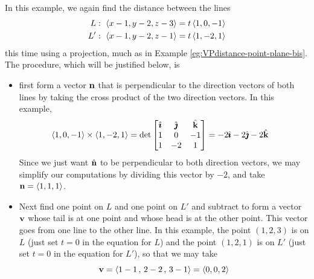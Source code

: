 \begin{eg}\label{eg:VPdistance-line-line-bis}
In this example, we again find the distance between the lines
\begin{align*}
L&:\  \left< x-1,y-2,z-3\right> = t \left< 1,0,-1 \right> \\
L'&:\ \left< x-1,y-2,z-1\right> = t \left< 1,-2,1 \right> 
\end{align*}
this time using a projection, much as in 
Example \ref{eg:VPdistance-point-plane-bis}. The procedure,
which will be justified below, is
\begin{itemize}
\item
first form a vector $\mathbf{n}$ that is perpendicular to the direction vectors
of both lines by taking the cross product of the two direction vectors.
In this example,
\begin{align*}
\left< 1,0,-1\right> \times\left< 1,-2,1\right> 
    & = \det\left[\begin{matrix}\hat{\pmb{\imath}}&\hat{\pmb{\jmath}}&\hat{\mathbf{k}}\\
                                       1 & 0 & -1\\
                                       1 &-2 & 1\end{matrix}\right]
    = -2\hat{\pmb{\imath}} -2 \hat{\pmb{\jmath}} -2\hat{\mathbf{k}}
\end{align*}
Since we just want $\hat{\mathbf{n}}$ to be perpendicular to both direction vectors,
we may simplify our computations by dividing this vector by $-2$, and take
$\mathbf{n} = \left< 1,1,1 \right>$.


\item
Next find one point on $L$ and one point on $L'$ and subtract to form a 
vector $\mathbf{v}$ whose tail is at one point and whose head is at the 
other point. This vector goes from one line to the other line. In this example,
the point $(1,2,3)$ is on $L$ (just set $t=0$ in the equation for $L$) and the point $(1,2,1)$ is on $L'$ (just set $t=0$ in the equation for $L'$),
so that we may take
\begin{equation*}
\mathbf{v} = \left< 1-1\,,\,2-2\,,\,3-1\right> = \left< 0,0,2 \right>
\end{equation*}


\end{itemize}
\end{eg}
